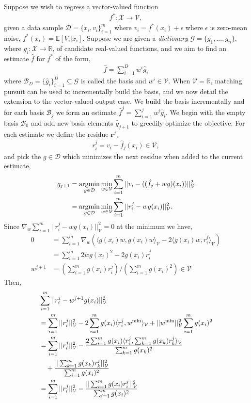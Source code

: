 \documentclass[letterpaper]{article}
\newcommand{\MallatMatchingPursuit}{DBLP:journals/tsp/MallatZ93}
\newcommand{\cD}{{\mathcal D}}
\newcommand{\cB}{{\mathcal B}}
\newcommand{\cV}{{\mathcal V}}
\newcommand{\cX}{{\mathcal X}}
\newcommand{\cG}{{\mathcal G}}
\newcommand{\br}{{\bm r}}
\newcommand{\E}{{\mathbb E}}
\newcommand{\R}{{\mathbb R}}
\newcommand{\argmin}{\operatornamewithlimits{argmin}}
\newcommand{\lang}{\langle}
\newcommand{\rang}{\rangle}
\newcommand{\nn}{\nonumber}
\begin{document}
Suppose we wish to regress a vector-valued function
\begin{align}
f^*:\cX\to\cV, \nn
\end{align}
given a data sample $\cD = \{x_i,v_i\}_{i=1}^m$ where $v_i = f^*(x_i)+\epsilon$ where $\epsilon$ is zero-mean noise, $f^*(x_i) = \E[V_i|x_i]$. Suppose we are given a \emph{dictionary} $\cG = \{g_1,...,g_n\}$, where $g_i:\cX\to\R$, of candidate real-valued functions, and we aim to find an estimate $\hat f$ for $f^*$ of the form,
\begin{align}
\hat f = \sum_{i=1}^D w^i \hat g_i \nn
\end{align}
where $\cB_D = \{ \hat g_i \}_{i=1}^D \subseteq \cG$ is called the basis and $w^i\in\cV$. When $\cV=\R$, matching pursuit \cite{\MallatMatchingPursuit} can be used to incrementally build the basis, and we now detail the extension to the vector-valued output case. We build the basis incrementally and for each basis $\cB_j$ we form an estimate $\hat f^j = \sum_{i=1}^j w^i \hat g_i$. We begin with the empty basis $\cB_0$  and add new basis elements $\hat g_{j+1}$ to greedily optimize the objective. For each estimate we define the residue $\br^j$,
\begin{align}
r^j_i = v_i - \hat f_j(x_i) \in\cV , \nn
\end{align}
and pick the $g\in\cD$ which minimizes the next residue when added to the current estimate,
\begin{align}
g_{j+1} &= \argmin_{g\in\cD}\min_{w \in\cV} \sum_{i=1}^m ||v_i - ( (\hat f_j + w g) (x_i)  )||_{\cV}^2 \nn\\
&=\argmin_{g\in\cD}\min_{w\in\cV} \sum_{i=1}^m ||r^j_i -  w g(x_i)  ||_{\cV}^2. \nn
\end{align}
Since $\nabla_{w}  \sum_{i=1}^m ||r^j_i -  w g(x_i)  ||_\cV^2  = 0$ at the minimum we have,
\begin{align}
0 &= \sum_{i=1}^m  \nabla_w \left(  \lang  g(x_i)w,g(x_i)w  \rang_{\cV} -2\lang g(x_i) w, r^j_i \rang_\cV \right)  \nn\\
&=  \sum_{i=1}^m 2w g(x_i)^2 -2 g(x_i)  r^j_i  \nn\\
w^{j+1} &=  \left(\sum_{i=1}^m  g(x_i)  r^j_i \right) /\left( \sum_{i=1}^m  g(x_i)^2 \right) \in\cV \nn
\end{align}
Then,
\begin{align}
&\sum_{i=1}^m ||r^j_i -  w^{j+1} g(x_i)  ||_{\cV}^2 \nn\\
&=  \sum_{i=1}^m ||r^j_i||_\cV^2 - 2\sum_{i=1}^m g(x_i)\lang  r^j_i,w^{\rm min} \rang_\cV + ||w^{\rm min}||_\cV^2 \sum_{i=1}^m  g(x_i)^2 \nn\\
&= \sum_{i=1}^m ||r^j_i||_\cV^2 - \frac{2\sum_{i=1}^m g(x_i)\lang  r^j_i, \sum_{k=1}^m  g(x_k)  r^j_k   \rang_\cV}{ \sum_{k=1}^m  g(x_k)^2} \\
&\quad + \frac{ ||\sum_{k=1}^m  g(x_k)  r^j_k  ||_\cV^2 }{ \sum_{i=1}^m  g(x_i)^2 }\nn\\
&= \sum_{i=1}^m ||r^j_i||_\cV^2 - \frac{ ||\sum_{i=1}^m  g(x_i)  r^j_i  ||_\cV^2 }{ \sum_{i=1}^m  g(x_i)^2 }\nn
\end{align}
\end{document}
